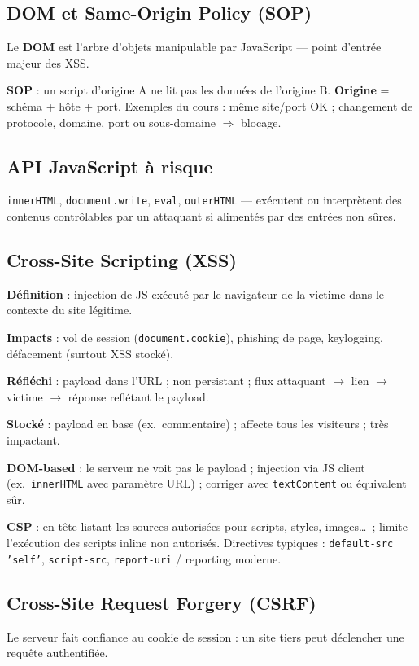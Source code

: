 \documentclass[11pt,a4paper]{article}
\begin{document}
\subsection{DOM et Same-Origin Policy (SOP)}
Le \textbf{DOM} est l'arbre d'objets manipulable par JavaScript — point d'entrée majeur des XSS.

\textbf{SOP} : un script d'origine A ne lit pas les données de l'origine B. \textbf{Origine} = schéma + hôte + port. Exemples du cours : même site/port OK ; changement de protocole, domaine, port ou sous-domaine $\Rightarrow$ blocage.

\subsection{API JavaScript à risque}
\texttt{innerHTML}, \texttt{document.write}, \texttt{eval}, \texttt{outerHTML} — exécutent ou interprètent des contenus contrôlables par un attaquant si alimentés par des entrées non sûres.

\subsection{Cross-Site Scripting (XSS)}
\textbf{Définition} : injection de JS exécuté par le navigateur de la victime dans le contexte du site légitime.

\textbf{Impacts} : vol de session (\texttt{document.cookie}), phishing de page, keylogging, défacement (surtout XSS stocké).

\textbf{Réfléchi} : payload dans l'URL ; non persistant ; flux attaquant $\rightarrow$ lien $\rightarrow$ victime $\rightarrow$ réponse reflétant le payload.

\textbf{Stocké} : payload en base (ex.\ commentaire) ; affecte tous les visiteurs ; très impactant.

\textbf{DOM-based} : le serveur ne voit pas le payload ; injection via JS client (ex.\ \texttt{innerHTML} avec paramètre URL) ; corriger avec \texttt{textContent} ou équivalent sûr.

\textbf{CSP} : en-tête listant les sources autorisées pour scripts, styles, images\ldots\ ; limite l'exécution des scripts inline non autorisés. Directives typiques : \texttt{default-src 'self'}, \texttt{script-src}, \texttt{report-uri} / reporting moderne.

\subsection{Cross-Site Request Forgery (CSRF)}
Le serveur fait confiance au cookie de session : un site tiers peut déclencher une requête authentifiée.
\end{document}
